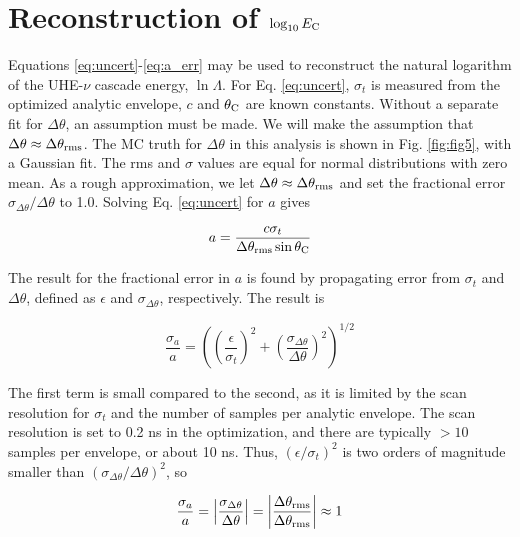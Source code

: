 \documentclass[amsmath,amssymb,aps,prd,10pt,twocolumn,showkeys]{revtex4}
\begin{document}
\section{Reconstruction of $\log_{10}E_{\rm C}$}
\label{sec:recon}

Equations \ref{eq:uncert}-\ref{eq:a_err} may be used to reconstruct the natural logarithm of the UHE-$\nu$ cascade energy, $\ln\Lambda$.  For Eq. \ref{eq:uncert}, $\sigma_t$ is measured from the optimized analytic envelope, $c$ and $\theta_{\rm C}$ are known constants.  Without a separate fit for $\Delta\theta$, an assumption must be made.  We will make the assumption that $\Delta\theta \approx \Delta\theta_{\rm rms}$.  The MC truth for $\Delta\theta$ in this analysis is shown in Fig. \ref{fig:fig5}, with a Gaussian fit.  The rms and $\sigma$ values are equal for normal distributions with zero mean.  As a rough approximation, we let $\Delta\theta \approx \Delta \theta_{\rm rms}$ and set the fractional error $\sigma_{\Delta\theta}/\Delta\theta$ to 1.0.  Solving Eq. \ref{eq:uncert} for $a$ gives

\begin{equation}
a = \frac{c\sigma_t}{\Delta\theta_{\rm rms} \sin\theta_{\rm C}}
\end{equation}

The result for the fractional error in $a$ is found by propagating error from $\sigma_t$ and $\Delta\theta$, defined as $\epsilon$ and $\sigma_{\Delta\theta}$, respectively.  The result is

\begin{equation}
\frac{\sigma_a}{a} = \left(\left(\frac{\epsilon}{\sigma_t}\right)^2 +  \left(\frac{\sigma_{\Delta\theta}}{\Delta\theta}\right)^2\right)^{1/2} \label{eq:err_prop}
\end{equation}

The first term is small compared to the second, as it is limited by the scan resolution for $\sigma_t$ and the number of samples per analytic envelope.  The scan resolution is set to 0.2 ns in the optimization, and there are typically $>10$ samples per envelope, or about 10 ns.  Thus, $\left(\epsilon/\sigma_t\right)^2$ is two orders of magnitude smaller than $\left(\sigma_{\Delta\theta}/\Delta\theta\right)^2$, so

\begin{equation}
\frac{\sigma_a}{a} = \left|\frac{\sigma_{\Delta\theta}}{\Delta\theta}\right| = \left|\frac{\Delta\theta_{\rm rms}}{\Delta\theta_{\rm rms}}\right|\approx 1
\end{equation}
\end{document}
